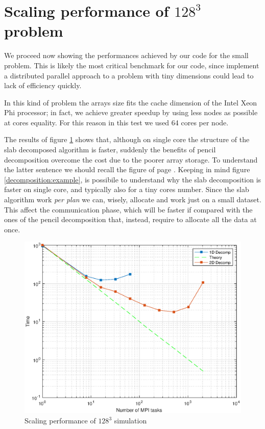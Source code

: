 \section{Scaling performance of $128^3$ problem}
We proceed now showing the performances achieved by our code for the small problem.
This is likely the most critical benchmark for our code, since implement a distributed parallel approach to a problem with tiny dimensions could lead to lack of efficiency quickly. 
\par
In this kind of problem the arrays size fits the cache dimension of the Intel Xeon Phi processor; in fact, we achieve greater speedup by using less nodes as possible at cores equality. For this reason in this test we used 64 cores per node. 
\par
The results of figure \ref{641} shows that, although on single core the structure of the slab decomposed algorithm is faster, suddenly the benefits of pencil decomposition overcome the cost due to the poorer array storage.
To understand the latter sentence we should recall the figure of page \pageref{decomposition:example}.
Keeping in mind figure \ref{decomposition:example}, is possibile to understand why the slab decomposition is faster on single core, and typically also for a tiny cores number. Since the slab algorithm work \emph{per plan} we can, wisely, allocate and work just on a small dataset. This affect the communication phase, which will be faster if compared with the ones of the pencil decomposition that, instead, require to allocate all the data at once. 
\par

\begin{figure}
\begin{center}
\includegraphics[scale=0.55]{grafici/641}
\caption{Scaling performance of $128^3$ simulation}
\label{641}
\end{center}
\end{figure}

